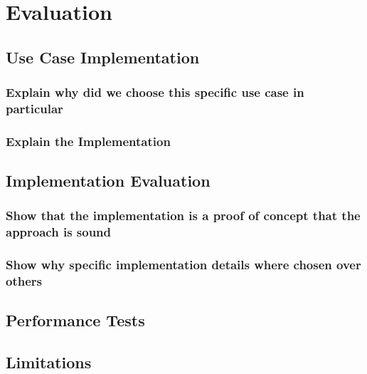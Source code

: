 
\chapter{Evaluation}\label{chapter:evaluation}

\section{Use Case Implementation}
\subsection{Explain why did we choose this specific use case in particular}
\subsection{Explain the Implementation}
\section{Implementation Evaluation}
\subsection{Show that the implementation is a proof of concept that the approach is sound}
\subsection{Show why specific implementation details where chosen over others}
\section{Performance Tests}
\section{Limitations}
